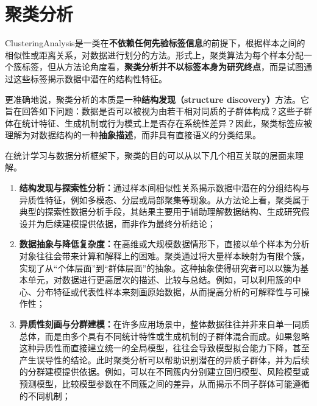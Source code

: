 \section{聚类分析}

\gls{ClusteringAnalysis}是一类在\textbf{不依赖任何先验标签信息}的前提下，根据样本之间的相似性或距离关系，对数据进行划分的方法。形式上，聚类算法为每个样本分配一个簇标签，但从方法论角度看，\textbf{聚类分析并不以标签本身为研究终点}，而是试图通过这些标签揭示数据中潜在的结构性特征。

更准确地说，聚类分析的本质是一种\textbf{结构发现（structure discovery）}方法。它旨在回答如下问题：数据是否可以被视为由若干相对同质的子群体构成？这些子群体在统计特征、生成机制或行为模式上是否存在系统性差异？因此，聚类标签应被理解为对数据结构的一种\textbf{抽象描述}，而非具有直接语义的分类结果。

在统计学习与数据分析框架下，聚类的目的可以从以下几个相互关联的层面来理解。

\begin{enumerate}
	\item \textbf{结构发现与探索性分析：}通过样本间相似性关系揭示数据中潜在的分组结构与异质性特征，例如多模态、分层或局部聚集等现象。从方法论上看，聚类属于典型的探索性数据分析手段，其结果主要用于辅助理解数据结构、生成研究假设并为后续建模提供依据，而非作为最终分析结论；
	\item \textbf{数据抽象与降低复杂度：}在高维或大规模数据情形下，直接以单个样本为分析对象往往会带来计算和解释上的困难。聚类通过将大量样本映射为有限个簇，实现了从“个体层面”到“群体层面”的抽象。这种抽象使得研究者可以以簇为基本单元，对数据进行更高层次的描述、比较与总结。例如，可以利用簇的中心、分布特征或代表性样本来刻画原始数据，从而提高分析的可解释性与可操作性；
	\item \textbf{异质性刻画与分群建模：}在许多应用场景中，整体数据往往并非来自单一同质总体，而是由多个具有不同统计特性或生成机制的子群体混合而成。如果忽略这种异质性而直接建立统一的全局模型，往往会导致模型拟合能力下降，甚至产生误导性的结论。此时聚类分析可以帮助识别潜在的异质子群体，并为后续的分群建模提供依据。例如，可以在不同簇内分别建立回归模型、风险模型或预测模型，比较模型参数在不同簇之间的差异，从而揭示不同子群体可能遵循的不同机制；
\end{enumerate}

